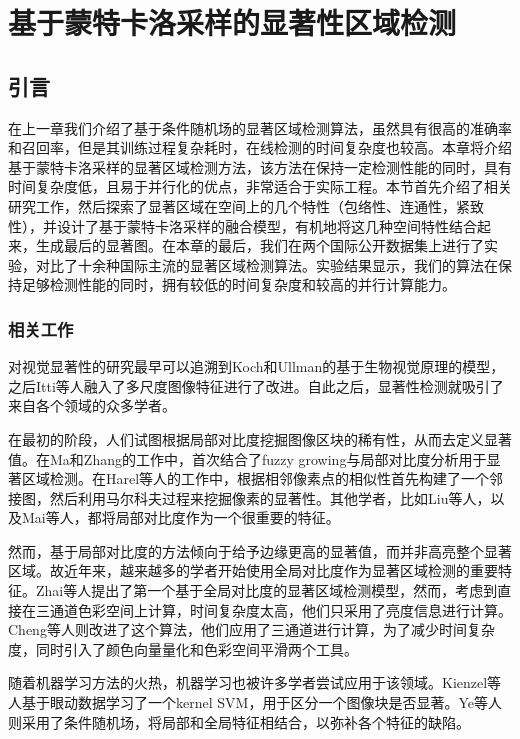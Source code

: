\chapter{基于蒙特卡洛采样的显著性区域检测}

\section{引言}
在上一章我们介绍了基于条件随机场的显著区域检测算法，虽然具有很高的准确率和召回率，但是其训练过程复杂耗时，在线检测的时间复杂度也较高。本章将介绍基于蒙特卡洛采样的显著区域检测方法，该方法在保持一定检测性能的同时，具有时间复杂度低，且易于并行化的优点，非常适合于实际工程。本节首先介绍了相关研究工作，然后探索了显著区域在空间上的几个特性（包络性、连通性，紧致性），并设计了基于蒙特卡洛采样的融合模型，有机地将这几种空间特性结合起来，生成最后的显著图。在本章的最后，我们在两个国际公开数据集上进行了实验，对比了十余种国际主流的显著区域检测算法。实验结果显示，我们的算法在保持足够检测性能的同时，拥有较低的时间复杂度和较高的并行计算能力。

\subsection{相关工作}
对视觉显著性的研究最早可以追溯到Koch和Ullman的基于生物视觉原理的模型\cite{koch1987shifts}，之后Itti等人融入了多尺度图像特征进行了改进\cite{itti1998model}。自此之后，显著性检测就吸引了来自各个领域的众多学者。

在最初的阶段，人们试图根据局部对比度挖掘图像区块的稀有性，从而去定义显著值。在Ma和Zhang的工作中\cite{ma2003contrast}，首次结合了fuzzy growing与局部对比度分析用于显著区域检测。在Harel等人的工作中\cite{harel2006graph}，根据相邻像素点的相似性首先构建了一个邻接图，然后利用马尔科夫过程来挖掘像素的显著性。其他学者，比如Liu等人\cite{liu2011learning}，以及Mai等人\cite{maisaliency}，都将局部对比度作为一个很重要的特征。

然而，基于局部对比度的方法倾向于给予边缘更高的显著值，而并非高亮整个显著区域。故近年来，越来越多的学者开始使用全局对比度作为显著区域检测的重要特征。Zhai等人\cite{zhai2006visual}提出了第一个基于全局对比度的显著区域检测模型，然而，考虑到直接在三通道色彩空间上计算，时间复杂度太高，他们只采用了亮度信息进行计算。Cheng等人\cite{cheng2011global}则改进了这个算法，他们应用了三通道进行计算，为了减少时间复杂度，同时引入了颜色向量量化和色彩空间平滑两个工具。

随着机器学习方法的火热，机器学习也被许多学者尝试应用于该领域。Kienzel等人\cite{zhai2006visual}基于眼动数据学习了一个kernel SVM，用于区分一个图像块是否显著。Ye等人\cite{ye2014salient}则采用了条件随机场，将局部和全局特征相结合，以弥补各个特征的缺陷。

